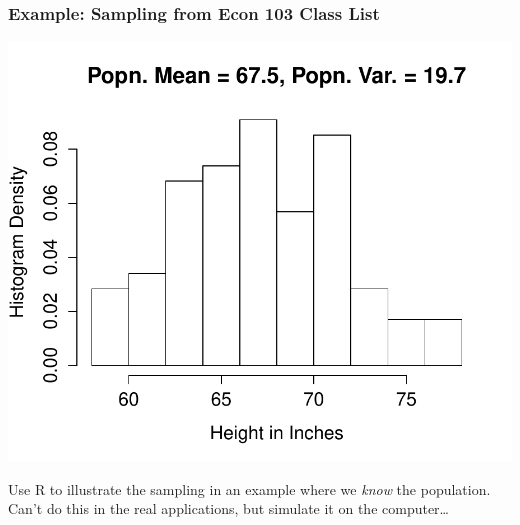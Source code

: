 \documentclass[handout]{beamer}
\begin{document}

\begin{frame}
\frametitle{Example: Sampling from Econ 103 Class List}
\begin{center}
\includegraphics[scale = 0.4]{./images/height_hist}
\end{center}
\alert{Use R to illustrate the sampling in an example where we \emph{know} the population.  
Can't do this in the real applications, but simulate it on the computer\dots}
\end{frame}
\end{document}
